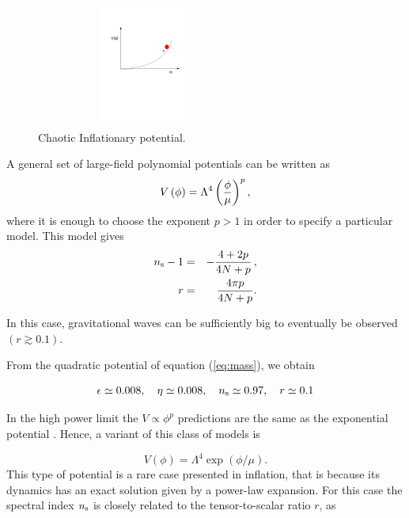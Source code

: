 \documentclass{rmaa}
\begin{document}
 \begin{figure}
 \begin{center}
  \includegraphics[trim = 20mm 120mm 10mm 40mm, clip, width=7cm, height=4cm]{new2.pdf}
	\caption{Chaotic Inflationary potential.}
	\label{fig:new1}
\end{center}	
\end{figure}

\noindent
 A general set of large-field polynomial potentials can be written as
%
\begin{equation}
V\left(\phi\right) = \Lambda^4 \left({\phi \over \mu}\right)^p,
\end{equation}
where it is enough to choose the exponent $p>1$ in order to specify a particular model.
%
This model gives
\begin{eqnarray}
n_{\rm s}-1&=&-\frac{4+2p}{4N+p}\, ,\nonumber\\
r&=&\frac{4\pi p}{4N+p}.
\end{eqnarray}

\noindent
In this case, gravitational waves can be sufficiently big to eventually be observed $(r\gtrsim 0.1)$.

From the quadratic potential of equation (\ref{eq:mass}), we obtain

\begin{equation}
\epsilon \simeq 0.008, \quad \eta \simeq 0.008, \quad n_{\rm s} \simeq 0.97, \quad r \simeq 0.1
\end{equation}

\noindent
In the high power limit the $V \propto \phi^p$ predictions are the same as the exponential 
potential \citep{La}. Hence, a variant of this class of models is 

\begin{equation}
V\left(\phi\right) = \Lambda^4 \exp\left(\phi / \mu\right).
\end{equation}
%
 This type of potential is a rare case presented in inflation, that is because its 
 dynamics has an exact solution given by a power-law expansion.
 For this case the spectral index $n_{\rm s}$ is closely related to the tensor-to-scalar ratio $r$, as 
\end{document}
